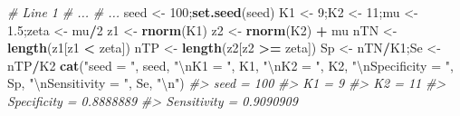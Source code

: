 \documentclass[
]{book}
\newenvironment{Shaded}{\begin{snugshade}}{\end{snugshade}}
\newcommand{\CharTok}[1]{\textcolor[rgb]{0.31,0.60,0.02}{#1}}
\newcommand{\CommentTok}[1]{\textcolor[rgb]{0.56,0.35,0.01}{\textit{#1}}}
\newcommand{\DecValTok}[1]{\textcolor[rgb]{0.00,0.00,0.81}{#1}}
\newcommand{\FloatTok}[1]{\textcolor[rgb]{0.00,0.00,0.81}{#1}}
\newcommand{\KeywordTok}[1]{\textcolor[rgb]{0.13,0.29,0.53}{\textbf{#1}}}
\newcommand{\NormalTok}[1]{#1}
\newcommand{\OperatorTok}[1]{\textcolor[rgb]{0.81,0.36,0.00}{\textbf{#1}}}
\newcommand{\StringTok}[1]{\textcolor[rgb]{0.31,0.60,0.02}{#1}}
\begin{document}
\begin{Shaded}
\begin{Highlighting}[]
\CommentTok{\# Line 1}
\CommentTok{\# ...}
\CommentTok{\# ...}
\NormalTok{seed \textless{}{-}}\StringTok{ }\DecValTok{100}\NormalTok{;}\KeywordTok{set.seed}\NormalTok{(seed)}
\NormalTok{K1 \textless{}{-}}\StringTok{ }\DecValTok{9}\NormalTok{;K2 \textless{}{-}}\StringTok{ }\DecValTok{11}\NormalTok{;mu \textless{}{-}}\StringTok{ }\FloatTok{1.5}\NormalTok{;zeta \textless{}{-}}\StringTok{ }\NormalTok{mu}\OperatorTok{/}\DecValTok{2}
\NormalTok{z1 \textless{}{-}}\StringTok{ }\KeywordTok{rnorm}\NormalTok{(K1)}
\NormalTok{z2 \textless{}{-}}\StringTok{ }\KeywordTok{rnorm}\NormalTok{(K2) }\OperatorTok{+}\StringTok{ }\NormalTok{mu}
\NormalTok{nTN \textless{}{-}}\StringTok{ }\KeywordTok{length}\NormalTok{(z1[z1 }\OperatorTok{\textless{}}\StringTok{ }\NormalTok{zeta])}
\NormalTok{nTP \textless{}{-}}\StringTok{ }\KeywordTok{length}\NormalTok{(z2[z2 }\OperatorTok{\textgreater{}=}\StringTok{ }\NormalTok{zeta])}
\NormalTok{Sp \textless{}{-}}\StringTok{ }\NormalTok{nTN}\OperatorTok{/}\NormalTok{K1;Se \textless{}{-}}\StringTok{ }\NormalTok{nTP}\OperatorTok{/}\NormalTok{K2}
\KeywordTok{cat}\NormalTok{(}\StringTok{"seed = "}\NormalTok{, seed, }
    \StringTok{"}\CharTok{\textbackslash{}n}\StringTok{K1 = "}\NormalTok{, K1, }
    \StringTok{"}\CharTok{\textbackslash{}n}\StringTok{K2 = "}\NormalTok{, K2, }
    \StringTok{"}\CharTok{\textbackslash{}n}\StringTok{Specificity = "}\NormalTok{, Sp, }
    \StringTok{"}\CharTok{\textbackslash{}n}\StringTok{Sensitivity = "}\NormalTok{, Se, }\StringTok{"}\CharTok{\textbackslash{}n}\StringTok{"}\NormalTok{)}
\CommentTok{\#\textgreater{} seed =  100 }
\CommentTok{\#\textgreater{} K1 =  9 }
\CommentTok{\#\textgreater{} K2 =  11 }
\CommentTok{\#\textgreater{} Specificity =  0.8888889 }
\CommentTok{\#\textgreater{} Sensitivity =  0.9090909}
\end{Highlighting}
\end{Shaded}
\end{document}
